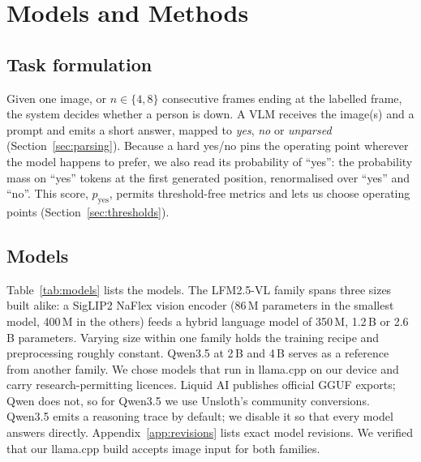 \section{Models and Methods}
\label{sec:methods}

\subsection{Task formulation}
Given one image, or $n \in \{4, 8\}$ consecutive frames ending at the labelled frame, the system decides whether a person is down. A VLM receives the image(s) and a prompt and emits a short answer, mapped to \textit{yes}, \textit{no} or \textit{unparsed} (Section~\ref{sec:parsing}). Because a hard yes/no pins the operating point wherever the model happens to prefer, we also read its probability of ``yes'': the probability mass on ``yes'' tokens at the first generated position, renormalised over ``yes'' and ``no''. This score, $p_\text{yes}$, permits threshold-free metrics and lets us choose operating points (Section~\ref{sec:thresholds}).

\subsection{Models}
Table~\ref{tab:models} lists the models. The LFM2.5-VL family \cite{amini2025lfm2,liquidai2026lfm25vl450m,liquidai2026lfm25vl3b} spans three sizes built alike: a SigLIP2 NaFlex vision encoder \cite{tschannen2025siglip2} (86\,M parameters in the smallest model, 400\,M in the others) feeds a hybrid language model of 350\,M, 1.2\,B or 2.6\,B parameters. Varying size within one family holds the training recipe and preprocessing roughly constant. Qwen3.5 at 2\,B and 4\,B \cite{qwen2026qwen35} serves as a reference from another family. We chose models that run in llama.cpp \cite{gerganov2023llamacpp} on our device and carry research-permitting licences. Liquid AI publishes official GGUF exports; Qwen does not, so for Qwen3.5 we use Unsloth's community conversions. Qwen3.5 emits a reasoning trace by default; we disable it so that every model answers directly. Appendix~\ref{app:revisions} lists exact model revisions. We verified that our llama.cpp build accepts image input for both families.


